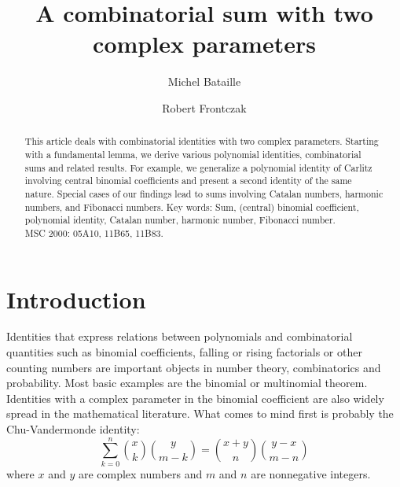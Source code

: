\documentclass[11pt,reqno]{amsart}
\theoremstyle{plain}
\numberwithin{equation}{section}
\begin{document}
\setcounter{page}{1}

\title[A combinatorial sum with two complex parameters]
{A combinatorial sum with two complex parameters}
%
\author{Michel Bataille}
\address{Independent Researcher, 76520 Franqueville-Saint-Pierre, France}
%
\medskip
%
\author{Robert Frontczak}
\address{Independent Researcher, 72764 Reutlingen, Germany}
%

\begin{abstract}
This article deals with combinatorial identities with two complex parameters. Starting with a fundamental lemma, we derive various polynomial identities, combinatorial sums and related results. For example, we generalize a polynomial identity of Carlitz involving central binomial coefficients and present a second identity of the same nature. Special cases of our findings lead to sums involving Catalan numbers, harmonic numbers, and Fibonacci numbers. 
\bigskip
\newline
{\sc Key words}: Sum, (central) binomial coefficient, polynomial identity, Catalan number, harmonic number, Fibonacci number. 
\\
{\sc MSC 2000}: 05A10, 11B65, 11B83. 
\\
\end{abstract}


\maketitle


\section{Introduction}

Identities that express relations between polynomials and combinatorial quantities such as binomial coefficients, falling or rising factorials or other counting numbers are important objects in number theory, combinatorics and probability. Most basic examples are the binomial or multinomial theorem. Identities with a complex parameter in the binomial coefficient are also widely spread in the mathematical literature. 
What comes to mind first is probably the Chu-Vandermonde identity: 
\begin{equation*}
\sum_{k=0}^n \binom{x}{k} \binom{y}{m-k} = \binom{x+y}{n} \binom{y-x}{m-n}
\end{equation*}
where $x$ and $y$ are complex numbers and $m$ and $n$ are nonnegative integers.\\ 
\end{document}
